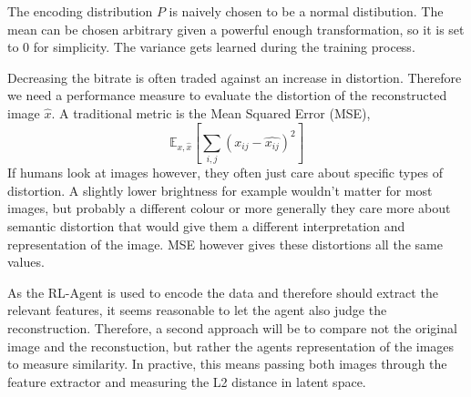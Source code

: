 
    

    The encoding distribution $P$ is naively chosen to be a normal distibution. The
    mean can be chosen arbitrary given a powerful enough transformation, so it is
    set to 0 for simplicity. The variance gets learned during the training process.


    Decreasing the bitrate is often traded against an increase in distortion.
    Therefore we need a performance measure to evaluate the distortion of the
    reconstructed image $\hat{x}$. A traditional metric is the Mean Squared Error (MSE),
    \begin{equation}\label{equ:L2}
        \mathbb{E}_{x, \hat{x}}[\sum_{i,j} (x_{ij} - \hat{x_{ij}})^2]
    \end{equation}
    If humans look at images however, they often just care about specific types
    of distortion. A slightly lower brightness for example wouldn't matter for
    most images, but probably a different colour or more generally they care
    more about semantic distortion that would give them a different
    interpretation and representation of the image. MSE however gives these
    distortions all the same values.

    As the RL-Agent is used to encode the data and therefore should extract the
    relevant features, it seems reasonable to let the agent also judge the
    reconstruction. Therefore, a second approach will be to compare not the
    original image and the reconstuction, but rather the agents representation
    of the images to measure similarity. In practive, this means passing both
    images through the feature extractor and measuring the L2 distance in latent
    space.

    

    
    


